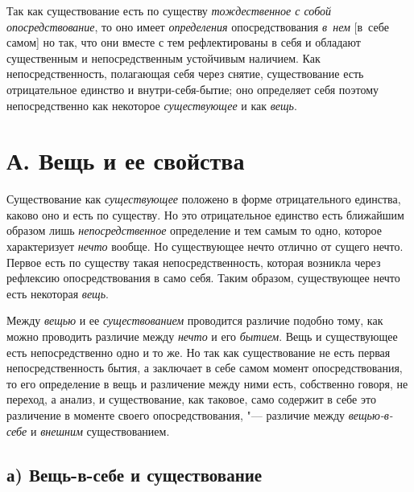 Так как существование есть по существу
{\em тождественное с собой опосредствование}, то оно
имеет {\em определения} опосредствования
{\em в~нем} [в~себе самом] но так, что они вместе с тем
рефлектированы в себя и обладают существенным и непосредственным устойчивым
наличием. Как непосредственность, полагающая себя через снятие,
существование есть отрицательное единство и внутри-себя-бытие; оно
определяет себя поэтому непосредственно как некоторое
{\em существующее} и как
{\em вещь}.


\section[А. Вещь и ее свойства]{А. Вещь и ее свойства}

Существование как {\em существующее} положено в форме отрицательного
единства, каково оно и есть по существу. Но это отрицательное единство есть
ближайшим образом лишь {\em непосредственное}
определение и тем самым то одно, которое характеризует
{\em нечто} вообще. Но существующее нечто отлично от
сущего нечто. Первое есть по существу такая непосредственность, которая
возникла через рефлексию опосредствования в само себя. Таким образом,
существующее нечто есть некоторая {\em вещь}.

Между {\em вещью} и ее
{\em существованием} проводится различие подобно тому,
как можно проводить различие между {\em нечто} и его
{\em бытием}. Вещь и существующее есть непосредственно
одно и то же. Но так как существование не есть первая непосредственность
бытия, а заключает в себе самом момент опосредствования, то его определение
в вещь и различение между ними есть, собственно говоря, не переход, а
анализ, и существование, как таковое, само содержит в себе это различение в
моменте своего опосредствования, "--- различие между
{\em вещью-в-себе} и {\em внешним} существованием.


\subsection[а) Вещь-в-себе и существование]{а) Вещь-в-себе и существование}

